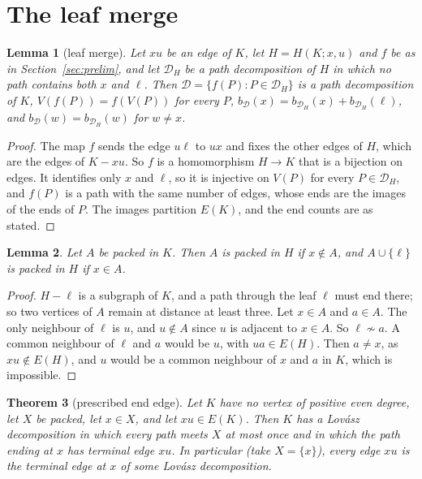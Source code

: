 \documentclass[11pt]{amsart}
\newtheorem{theorem}{Theorem}
\newtheorem{lemma}[theorem]{Lemma}
\theoremstyle{definition}
\newcommand{\cD}{\mathcal D}
\begin{document}
\section{The leaf merge}\label{sec:merge}

\begin{lemma}[leaf merge]\label{lem:merge}
Let $xu$ be an edge of $K$, let $H=H(K;x,u)$ and $f$ be as in Section~\ref{sec:prelim}, and let
$\cD_H$ be a path decomposition of $H$ in which no path contains both $x$ and $\ell$. Then
$\cD=\{f(P):P\in\cD_H\}$ is a path decomposition of $K$, $V(f(P))=f(V(P))$ for every $P$,
$b_\cD(x)=b_{\cD_H}(x)+b_{\cD_H}(\ell)$, and $b_\cD(w)=b_{\cD_H}(w)$ for $w\ne x$.
\end{lemma}

\begin{proof}
The map $f$ sends the edge $u\ell$ to $ux$ and fixes the other edges of $H$, which are the edges of
$K-xu$. So $f$ is a homomorphism $H\to K$ that is a bijection on edges. It identifies only $x$ and $\ell$,
so it is injective on $V(P)$ for every $P\in\cD_H$, and $f(P)$ is a path with the same number of edges,
whose ends are the images of the ends of $P$. The images partition $E(K)$, and the end counts are as
stated.
\end{proof}

\begin{lemma}\label{lem:packedlift}
Let $A$ be packed in $K$. Then $A$ is packed in $H$ if $x\notin A$, and $A\cup\{\ell\}$ is packed in $H$
if $x\in A$.
\end{lemma}

\begin{proof}
$H-\ell$ is a subgraph of $K$, and a path through the leaf $\ell$ must end there; so two vertices of $A$
remain at distance at least three. Let $x\in A$
and $a\in A$. The only neighbour of $\ell$ is $u$, and $u\notin A$ since $u$ is adjacent to $x\in A$. So
$\ell\not\sim a$. A common neighbour of $\ell$ and $a$ would be $u$, with $ua\in E(H)$. Then $a\ne x$, as
$xu\notin E(H)$, and $u$ would be a common neighbour of $x$ and $a$ in $K$, which is impossible.
\end{proof}

\begin{theorem}[prescribed end edge]\label{thm:endedge}
Let $K$ have no vertex of positive even degree, let $X$ be packed, let $x\in X$, and let $xu\in E(K)$.
Then $K$ has a Lov\'asz decomposition in which every path meets $X$ at most once and in which the path
ending at $x$ has terminal edge $xu$. In particular (take $X=\{x\}$), every edge $xu$ is the terminal
edge at $x$ of some Lov\'asz decomposition.
\end{theorem}
\end{document}
